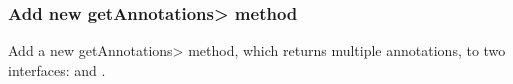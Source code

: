 \documentclass[10pt]{article}
\begin{document}
% 
% 
% 
% 
% 
% 
% 
% 
% 
% 
% 
% 
% 
% 


\subsubsection{Add new \<getAnnotations> method}

Add a new \<getAnnotations> method, which returns multiple annotations,
to two interfaces:  and
.
\end{document}
